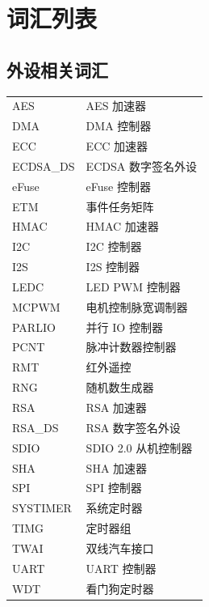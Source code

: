 \section*{词汇列表}\label{glossary}
\rhead{\Navigation}

\subsection*{外设相关词汇}

\begin{longtable}[c]{p{3cm}p{12cm} }

AES & AES 加速器 \\
DMA & DMA 控制器 \\
ECC & ECC 加速器 \\
ECDSA\_DS & ECDSA 数字签名外设 \\
eFuse & eFuse 控制器 \\
ETM & 事件任务矩阵 \\
HMAC & HMAC 加速器 \\
I2C & I2C 控制器 \\
I2S & I2S 控制器 \\
LEDC & LED PWM 控制器 \\
MCPWM & 电机控制脉宽调制器 \\
PARLIO & 并行 IO 控制器 \\
PCNT & 脉冲计数器控制器 \\
RMT & 红外遥控 \\
RNG & 随机数生成器 \\
RSA & RSA 加速器 \\
RSA\_DS & RSA 数字签名外设 \\
SDIO & SDIO 2.0 从机控制器 \\
SHA & SHA 加速器 \\
SPI & SPI 控制器 \\
SYSTIMER & 系统定时器  \\
TIMG & 定时器组 \\
TWAI & 双线汽车接口 \\
UART & UART 控制器 \\
WDT & 看门狗定时器 \\

\end{longtable}





